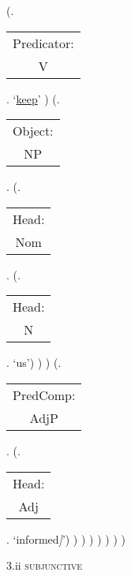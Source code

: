 \documentclass[12pt,letterpaper]{article}
\begin{document}
\begin{figure}
\begin{center}
\begin{parsetree}
			(.\begin{tabular}{c}Predicator:\\V\end{tabular}.    `\underline{keep}' )
			(.\begin{tabular}{c}Object:\\NP\end{tabular}.  
			(.\begin{tabular}{c}Head:\\Nom\end{tabular}.
			(.\begin{tabular}{c}Head:\\N\end{tabular}. `us')
			)
			)
			(.\begin{tabular}{c}PredComp:\\AdjP\end{tabular}.  
			(.\begin{tabular}{c}Head:\\Adj\end{tabular}. `informed\emph{]}')
			)
			)
			)
			)
			)
			)
			)
			
		\end{parsetree}
		\hfill \break \hfill \break
		3.ii \textsc{subjunctive} 
	\end{center}
\end{figure}
\end{document}
